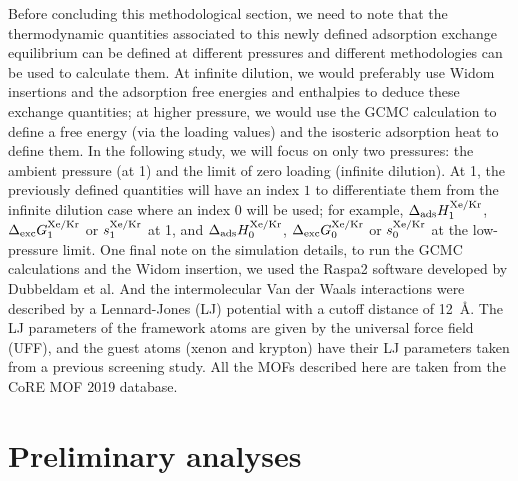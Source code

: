 \documentclass[main.tex]{subfiles}
\begin{document}
Before concluding this methodological section, we need to note that the thermodynamic quantities associated to this newly defined adsorption exchange equilibrium can be defined at different pressures and different methodologies can be used to calculate them. At infinite dilution, we would preferably use Widom insertions and the adsorption free energies and enthalpies to deduce these exchange quantities; at higher pressure, we would use the GCMC calculation to define a free energy (via the loading values) and the isosteric adsorption heat to define them. In the following study, we will focus on only two pressures: the ambient pressure (at \SI{1}{\atm}) and the limit of zero loading (infinite dilution). At \SI{1}{\atm}, the previously defined quantities will have an index $1$ to differentiate them from the infinite dilution case where an index $0$ will be used; for example, $\Delta_{\text{ads}}H_{\text{1}}^{\text{Xe/Kr}}$, $\Delta_{\text{exc}}G_{\text{1}}^{\text{Xe/Kr}}$ or $s_{\text{1}}^{\text{Xe/Kr}}$ at \SI{1}{\atm}, and $\Delta_{\text{ads}}H_{\text{0}}^{\text{Xe/Kr}}$, $\Delta_{\text{exc}}G_{\text{0}}^{\text{Xe/Kr}}$ or $s_{\text{0}}^{\text{Xe/Kr}}$ at the low-pressure limit. One final note on the simulation details, to run the GCMC calculations and the Widom insertion, we used the Raspa2 software developed by Dubbeldam et al.\cite{dubbeldam2016} And the intermolecular Van der Waals interactions were described by a Lennard-Jones (LJ) potential with a cutoff distance of \SI{12}{\angstrom}. The LJ parameters of the framework atoms are given by the universal force field (UFF),\cite{rappe1992} and the guest atoms (xenon and krypton) have their LJ parameters taken from a previous screening study.\cite{Ryan_2010} All the MOFs described here are taken from the CoRE MOF 2019 database.\cite{Chung_2019}


\section{Preliminary analyses}
\end{document}
